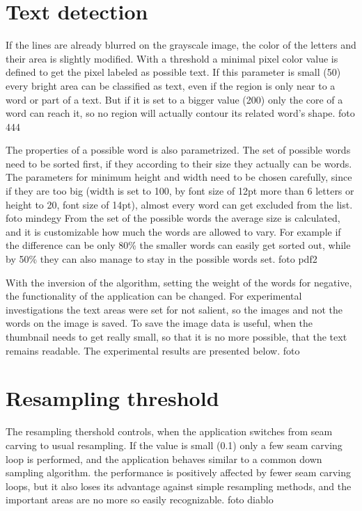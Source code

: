 \documentclass[draft,final]{vutinfth} %
\begin{document}
	\section{Text detection}
	If the lines are already blurred on the grayscale image, the color of the letters and their area is slightly modified. 
	With a threshold a minimal pixel color value is defined to get the pixel labeled as possible text.
	If this parameter is small (50) every bright area can be classified as text, even if the region is only near to a word or part of a text.
	But if it is set to a bigger value (200) only the core of a word can reach it, so no region will actually contour its related word's shape.
	foto 444\par
	The properties of a possible word is also parametrized.
	The set of possible words need to be sorted first, if they according to their size they actually can be words.
	The parameters for minimum height and width need to be chosen carefully, since if they are too big (width is set to 100, by font size of 12pt more than 6 letters or height to 20, font size of 14pt), almost every word can get excluded from the list.
	foto mindegy 
	From the set of the possible words the average size is calculated, and it is customizable how much the words are allowed to vary.
	For example if the difference can be only 80\% the smaller words can easily get sorted out, while by 50\% they can also manage to stay in the possible words set.
	foto pdf2\par 
	With the inversion of the algorithm, setting the weight of the words for negative, the functionality of the application can be changed.
	For experimental investigations the text areas were set for not salient, so the images and not the words on the image is saved. 
	To save the image data is useful, when the thumbnail needs to get really small, so that it is no more possible, that the text remains readable. 
	The experimental results are presented below.
	foto 
	\section{Resampling threshold}
	The resampling thershold controls, when the application switches from seam carving to usual resampling. 
	If the value is small (0.1) only a few seam carving loop is performed, and the application behaves similar to a common down sampling algorithm.
	the performance is positively affected by fewer seam carving loops, but it also loses its advantage against simple resampling methods, and the important areas are no more so easily recognizable.
	foto diablo 
\end{document}
